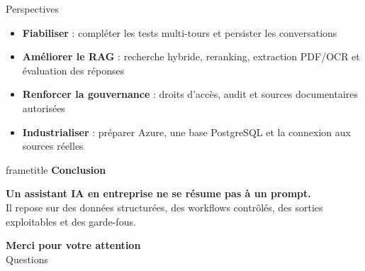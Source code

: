 \documentclass[aspectratio=169,11pt,french]{beamer}
\begin{document}
\begin{frame}{Perspectives}
  \vspace{.45cm}
  \begin{itemize}
    \item \textbf{Fiabiliser} : compléter les tests multi-tours et persister les conversations
    \vspace{.38cm}
    \item \textbf{Améliorer le RAG} : recherche hybride, reranking, extraction PDF/OCR et évaluation des réponses
    \vspace{.38cm}
    \item \textbf{Renforcer la gouvernance} : droits d'accès, audit et sources documentaires autorisées
    \vspace{.38cm}
    \item \textbf{Industrialiser} : préparer Azure, une base PostgreSQL et la connexion aux sources réelles
  \end{itemize}
\end{frame}

\begin{frame}[plain]
  \vspace*{1.1cm}
  \begin{beamercolorbox}[wd=\paperwidth,sep=.5cm,center]{frametitle}
    {\color{white}\fontsize{28}{32}\selectfont\bfseries Conclusion}
  \end{beamercolorbox}
  \vspace{.9cm}
  \begin{center}
    {\LARGE\bfseries Un assistant IA en entreprise ne se résume pas à un prompt.}\\[.55cm]
    {\large Il repose sur des données structurées, des workflows contrôlés,
    des sorties exploitables et des garde-fous.}
  \end{center}
  \vfill
  \begin{center}
    {\color{StagePurple}\Huge\bfseries Merci pour votre attention}\\[.25cm]
    {\Large Questions}
  \end{center}
  \vfill
\end{frame}
\end{document}
